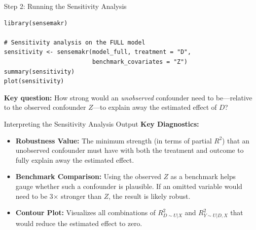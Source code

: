 \documentclass[aspectratio=169, handout, t]{beamer}
\numberwithin{equation}{section}
\begin{document}
\begin{frame}[fragile]{Step 2: Running the Sensitivity Analysis}
\begin{lstlisting}
library(sensemakr)

# Sensitivity analysis on the FULL model
sensitivity <- sensemakr(model_full, treatment = "D",
                         benchmark_covariates = "Z")
summary(sensitivity)
plot(sensitivity)
\end{lstlisting}
\vspace{1ex}
\textbf{Key question:} How strong would an \emph{unobserved} confounder need to be---relative to the observed confounder $Z$---to explain away the estimated effect of $D$?
\end{frame}

\begin{frame}{Interpreting the Sensitivity Analysis Output}
\textbf{Key Diagnostics:}
\begin{itemize}
    \item \textbf{Robustness Value:} The minimum strength (in terms of partial \(R^2\)) that an unobserved confounder must have with both the treatment and outcome to fully explain away the estimated effect.
    \item \textbf{Benchmark Comparison:} Using the observed \(Z\) as a benchmark helps gauge whether such a confounder is plausible. If an omitted variable would need to be 3$\times$ stronger than \(Z\), the result is likely robust.
    \item \textbf{Contour Plot:} Visualizes all combinations of $R^2_{D\sim U|X}$ and $R^2_{Y\sim U|D,X}$ that would reduce the estimated effect to zero.
\end{itemize}
\end{frame}
\end{document}
